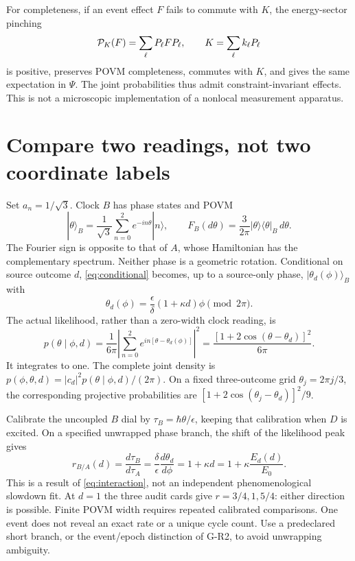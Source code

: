 \documentclass[11pt,a4paper]{article}
\newcommand{\ket}[1]{|#1\rangle}
\newcommand{\bra}[1]{\langle#1|}
\newcommand{\pr}[1]{\ket{#1}\bra{#1}}
\begin{document}
For completeness, if an event effect $F$ fails to commute with $K$,
the energy-sector pinching
\begin{equation}
 {\cal P}_K(F)=\sum_\ell P_\ell F P_\ell,\qquad
 K=\sum_\ell k_\ell P_\ell
\end{equation}
is positive, preserves POVM completeness, commutes with $K$, and gives
the same expectation in $\Psi$. The joint probabilities thus admit
constraint-invariant effects. This is not a microscopic implementation
of a nonlocal measurement apparatus.

\newpage
\section{Compare two readings, not two coordinate labels}
Set $a_n=1/\sqrt3$. Clock $B$ has phase states and POVM
\begin{equation}
 \ket\theta_B=\frac1{\sqrt3}\sum_{n=0}^2e^{-in\theta}\ket n,\qquad
 F_B(d\theta)=\frac3{2\pi}\pr\theta_B\,d\theta .
\end{equation}
The Fourier sign is opposite to that of $A$, whose Hamiltonian has the
complementary spectrum. Neither phase is a geometric rotation.
Conditional on source outcome $d$, \eqref{eq:conditional} becomes,
up to a source-only phase, $\ket{\theta_d(\phi)}_B$ with
\begin{equation}
 \theta_d(\phi)=\frac{\epsilon}{\delta}(1+\kappa d)\phi
 \pmod{2\pi}.
\end{equation}
The actual likelihood, rather than a zero-width clock reading, is
\begin{equation}\label{eq:likelihood}
 p(\theta\mid\phi,d)
 =\frac{1}{6\pi}\left|\sum_{n=0}^2
      e^{in[\theta-\theta_d(\phi)]}\right|^2
 =\frac{[1+2\cos(\theta-\theta_d)]^2}{6\pi}.
\end{equation}
It integrates to one. The complete joint density is
$p(\phi,\theta,d)=|c_d|^2p(\theta\mid\phi,d)/(2\pi)$.
On a fixed three-outcome grid $\theta_j=2\pi j/3$, the corresponding
projective probabilities are $[1+2\cos(\theta_j-\theta_d)]^2/9$.

Calibrate the uncoupled $B$ dial by $\tau_B=\hbar\theta/\epsilon$,
keeping that calibration when $D$ is excited. On a specified unwrapped
phase branch, the shift of the likelihood peak gives
\begin{equation}\label{eq:rate}
 r_{B/A}(d)=\frac{d\tau_B}{d\tau_A}
  =\frac{\delta}{\epsilon}\frac{d\theta_d}{d\phi}
  =1+\kappa d
  =1+\kappa\frac{E_d(d)}{E_0}.
\end{equation}
This is a result of \eqref{eq:interaction}, not an independent
phenomenological slowdown fit. At $d=1$ the three audit cards give
$r=3/4,1,5/4$: either direction is possible.
Finite POVM width requires repeated calibrated comparisons.
One event does not reveal an exact rate or a unique cycle count.
Use a predeclared short branch, or the event/epoch distinction of G-R2,
to avoid unwrapping ambiguity.
\end{document}
